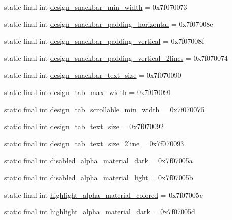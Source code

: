 \begin{CompactItemize}
\item 
static final int \hyperlink{classcom_1_1companyname_1_1x__2doo_1_1_r_1_1dimen_31793ff7dbd2b1e702e96173ae56c71a}{design\_\-snackbar\_\-min\_\-width} = 0x7f070073
\item 
static final int \hyperlink{classcom_1_1companyname_1_1x__2doo_1_1_r_1_1dimen_8cf92d005b02412be6c127ed47dc45cf}{design\_\-snackbar\_\-padding\_\-horizontal} = 0x7f07008e
\item 
static final int \hyperlink{classcom_1_1companyname_1_1x__2doo_1_1_r_1_1dimen_50fbd63998e63f7d02765a95c00c59cb}{design\_\-snackbar\_\-padding\_\-vertical} = 0x7f07008f
\item 
static final int \hyperlink{classcom_1_1companyname_1_1x__2doo_1_1_r_1_1dimen_b1f738b37bf28ec0d7d08d243bfb246c}{design\_\-snackbar\_\-padding\_\-vertical\_\-2lines} = 0x7f070074
\item 
static final int \hyperlink{classcom_1_1companyname_1_1x__2doo_1_1_r_1_1dimen_34707715182ec74bec4d3bc54533ebd4}{design\_\-snackbar\_\-text\_\-size} = 0x7f070090
\item 
static final int \hyperlink{classcom_1_1companyname_1_1x__2doo_1_1_r_1_1dimen_dc171685ee7a049a6916f9aedf1dd485}{design\_\-tab\_\-max\_\-width} = 0x7f070091
\item 
static final int \hyperlink{classcom_1_1companyname_1_1x__2doo_1_1_r_1_1dimen_d48dd623b274f295b3294c49dd9ea7c4}{design\_\-tab\_\-scrollable\_\-min\_\-width} = 0x7f070075
\item 
static final int \hyperlink{classcom_1_1companyname_1_1x__2doo_1_1_r_1_1dimen_11241f23750ab1368deee3875ca48163}{design\_\-tab\_\-text\_\-size} = 0x7f070092
\item 
static final int \hyperlink{classcom_1_1companyname_1_1x__2doo_1_1_r_1_1dimen_e74ec908d36e4e723d143d126c05c5f4}{design\_\-tab\_\-text\_\-size\_\-2line} = 0x7f070093
\item 
static final int \hyperlink{classcom_1_1companyname_1_1x__2doo_1_1_r_1_1dimen_74bf7ff5f69e041ed05e970307085855}{disabled\_\-alpha\_\-material\_\-dark} = 0x7f07005a
\item 
static final int \hyperlink{classcom_1_1companyname_1_1x__2doo_1_1_r_1_1dimen_0488f79e4bd6fd08e6da64d63cc62ec7}{disabled\_\-alpha\_\-material\_\-light} = 0x7f07005b
\item 
static final int \hyperlink{classcom_1_1companyname_1_1x__2doo_1_1_r_1_1dimen_19c1ea5648c31d1a72df775dc03bd557}{highlight\_\-alpha\_\-material\_\-colored} = 0x7f07005c
\item 
static final int \hyperlink{classcom_1_1companyname_1_1x__2doo_1_1_r_1_1dimen_c63a08bf2213f1611195c9568ea751a4}{highlight\_\-alpha\_\-material\_\-dark} = 0x7f07005d

\end{CompactItemize}
